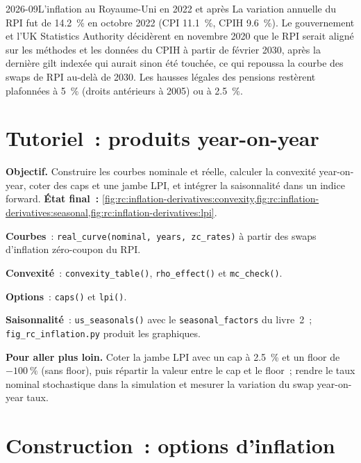 \begin{dated}{2026-09}{L'inflation au Royaume-Uni en 2022 et après}\label{dat:rc:inflation-derivatives:uk}
La variation annuelle du RPI fut de 14.2~\% en octobre 2022 (CPI 11.1~\%, CPIH 9.6~\%). Le
gouvernement et l'UK Statistics Authority décidèrent en novembre 2020 que le RPI serait
aligné sur les méthodes et les données du CPIH à partir de février 2030, après la dernière
gilt indexée qui aurait sinon été touchée, ce qui repoussa la courbe des swaps de RPI
au-delà de 2030. Les hausses légales des pensions restèrent plafonnées à 5~\% (droits antérieurs à 2005) ou
à 2.5~\%.
\end{dated}

\section{Tutoriel~: produits year-on-year}\label{tut:rc:inflation-derivatives:tutorial}

\begin{tutorial}
\textbf{Objectif.} Construire les courbes nominale et réelle, calculer la convexité year-on-year,
coter des caps et une jambe LPI, et intégrer la saisonnalité dans un indice forward. \textbf{État final~:}
\cref{fig:rc:inflation-derivatives:convexity,fig:rc:inflation-derivatives:seasonal,fig:rc:inflation-derivatives:lpi}.
\begin{tutsteps}
\item \textbf{Courbes}~: \texttt{real\_curve(nominal, years, zc\_rates)} à partir des
swaps d'inflation zéro-coupon du RPI.
\item \textbf{Convexité}~: \texttt{convexity\_table()}, \texttt{rho\_effect()} et
\texttt{mc\_check()}.
\item \textbf{Options}~: \texttt{caps()} et \texttt{lpi()}.
\item \textbf{Saisonnalité}~: \texttt{us\_seasonals()} avec le \texttt{seasonal\_factors}
du livre~2~; \texttt{fig\_rc\_inflation.py} produit les graphiques.
\end{tutsteps}
\textbf{Pour aller plus loin.} Coter la jambe LPI avec un cap à 2.5~\% et un floor de
$-100~\%$ (sans floor), puis répartir la valeur entre le cap et le floor~; rendre le
taux nominal stochastique dans la simulation et mesurer la variation du swap year-on-year
taux.
\end{tutorial}

\section{Construction~: options d'inflation}\label{bld:rc:inflation-derivatives:inflopt}

